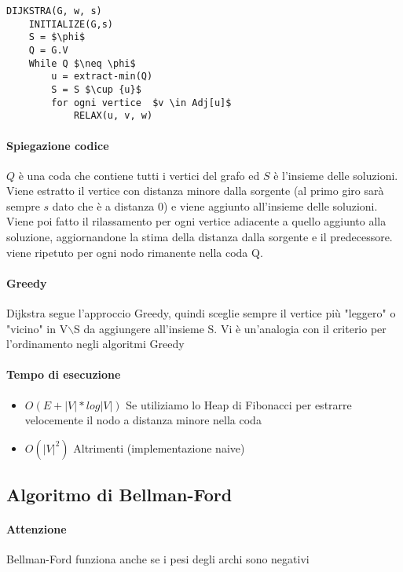 \documentclass[12pt, a4paper, openany]{book}
\begin{document}
\begin{lstlisting}
DIJKSTRA(G, w, s)
    INITIALIZE(G,s)
    S = $\phi$
    Q = G.V
    While Q $\neq \phi$
        u = extract-min(Q)
        S = S $\cup {u}$
        for ogni vertice  $v \in Adj[u]$ 
            RELAX(u, v, w)
\end{lstlisting}

	\paragraph{Spiegazione codice}
$Q$ è una coda che contiene tutti i vertici del grafo ed $S$ è l'insieme delle soluzioni.
	Viene estratto il vertice con distanza minore dalla sorgente (al primo giro sarà sempre $s$ dato che è
	a distanza 0) e viene aggiunto all'insieme delle soluzioni. Viene poi fatto il rilassamento per ogni vertice adiacente
	a quello aggiunto alla soluzione, aggiornandone la stima della distanza dalla sorgente e il predecessore.
	viene ripetuto per ogni nodo rimanente nella coda Q.

	\paragraph{Greedy}
	Dijkstra segue l'approccio Greedy, quindi sceglie sempre il vertice più "leggero" o "vicino" in V$\backslash$S
	da aggiungere all'insieme S. Vi è un'analogia con il criterio per l'ordinamento negli algoritmi Greedy

	\paragraph{Tempo di esecuzione}
	\begin{itemize}
		\item $O(E + |V|*log|V|)$ Se utiliziamo lo Heap di Fibonacci per estrarre velocemente il nodo a distanza minore nella coda
		\item $O(|V|^2)$ Altrimenti (implementazione naive)
	\end{itemize}

	\subsection{Algoritmo di Bellman-Ford}

	\paragraph{Attenzione}
	Bellman-Ford funziona anche se i pesi degli archi sono negativi
\end{document}
